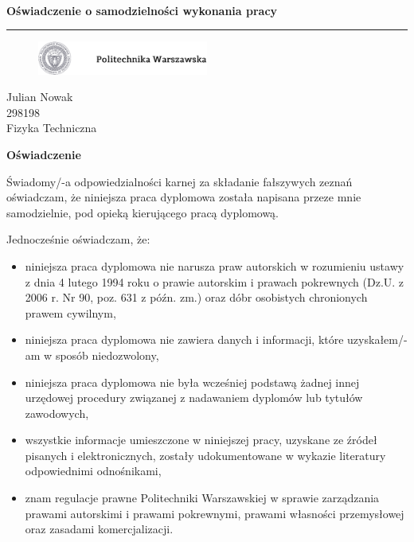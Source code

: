 


\newpage
\mbox{ }

\newpage
{\large \textbf{Oświadczenie o samodzielności wykonania pracy}}\\
{\color{sliwka}\rule[1pt]{\textwidth}{1.5pt}}

\vspace{0.6cm}

\begin{figure}[h!]
	\includegraphics[width=0.5\textwidth]{img/pw_logo_tekst.png}
\end{figure}

\vspace{0.6cm}
{\large Julian Nowak}\\
298198\\
Fizyka Techniczna\\

\begin{center}
	{\large \textbf{Oświadczenie}}
\end{center}

{\large Świadomy/-a odpowiedzialności karnej za składanie fałszywych zeznań oświadczam, że niniejsza praca dyplomowa została napisana przeze mnie samodzielnie, pod opieką kierującego pracą dyplomową.}


Jednocześnie oświadczam, że:
\begin{itemize}
	\item niniejsza praca dyplomowa nie narusza praw autorskich w rozumieniu ustawy z dnia 4 lutego 1994 roku o prawie autorskim i prawach pokrewnych (Dz.U. z 2006 r. Nr 90, poz. 631 z późn. zm.) oraz dóbr osobistych chronionych prawem cywilnym,
	\item niniejsza praca dyplomowa nie zawiera danych i informacji, które uzyskałem/-am w sposób niedozwolony,
	\item niniejsza praca dyplomowa nie była wcześniej podstawą żadnej innej urzędowej procedury związanej z nadawaniem dyplomów lub tytułów zawodowych,
	\item wszystkie informacje umieszczone w niniejszej pracy, uzyskane ze źródeł pisanych i elektronicznych, zostały udokumentowane w wykazie literatury odpowiednimi odnośnikami,
	\item znam regulacje prawne Politechniki Warszawskiej w sprawie zarządzania prawami autorskimi i prawami pokrewnymi, prawami własności przemysłowej oraz zasadami komercjalizacji.
\end{itemize}

